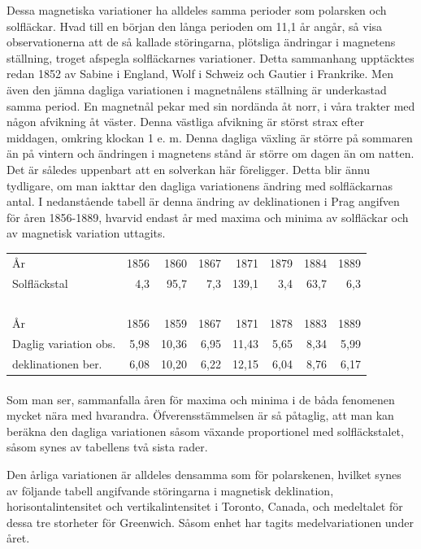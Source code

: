 \documentclass[a4paper, 12pt, oneside, swedish]{article}
\begin{document}
Dessa magnetiska variationer ha alldeles samma perioder som polarsken och solfläckar. Hvad till en början den långa perioden om 11,1 år angår, så visa observationerna att de så kallade störingarna, plötsliga ändringar i magnetens ställning, troget afspegla solfläckarnes variationer. Detta sammanhang upptäcktes redan 1852 av Sabine i England, Wolf i Schweiz och Gautier i Frankrike. Men även den jämna dagliga variationen i magnetnålens ställning är underkastad samma period. En magnetnål pekar med sin nordända åt norr, i våra trakter med någon afvikning åt väster. Denna västliga afvikning är störst strax efter middagen, omkring klockan 1 e. m. Denna dagliga växling är större på sommaren än på vintern och ändringen i magnetens stånd är större om dagen än om natten. Det är således uppenbart att en solverkan här föreligger. Detta blir ännu tydligare, om man iakttar den dagliga variationens ändring med solfläckarnas antal. I nedanstående tabell är denna ändring av deklinationen i Prag angifven för åren 1856-1889, hvarvid endast år med maxima och minima av solfläckar och av magnetisk variation uttagits.

\begin{table}[H]
    \centering
    \footnotesize
    \Fontauri
    \begin{tabular}{l r r r r r r r}
        År & 1856 & 1860 & 1867 & 1871 & 1879 & 1884 & 1889 \\
        Solfläckstal & 4,3 & 95,7 & 7,3 & 139,1 & 3,4 & 63,7 & 6,3   \\ \hline
        ~ & ~ & ~ & ~ & ~ & ~ & ~ & ~ \\
        År & 1856 & 1859 & 1867 & 1871 & 1878 & 1883 & 1889 \\
        Daglig variation obs. & 5,98 & 10,36 & 6,95 & 11,43 & 5,65 & 8,34 & 5,99   \\
        deklinationen ber. & 6,08 & 10,20 & 6,22 & 12,15 & 6,04 & 8,76 & 6,17 \\
    \end{tabular}
\end{table}
\paragraph{}
Som man ser, sammanfalla åren för maxima och minima i de båda fenomenen mycket nära med hvarandra. Öfverensstämmelsen är så påtaglig, att man kan beräkna den dagliga variationen såsom växande proportionel med solfläckstalet, såsom synes av tabellens två sista rader.

Den årliga variationen är alldeles densamma som för polarskenen, hvilket synes av följande tabell angifvande störingarna i magnetisk deklination, horisontalintensitet och vertikalintensitet i Toronto, Canada, och medeltalet för dessa tre storheter för Greenwich. Såsom enhet har tagits medelvariationen under året.
\end{document}
